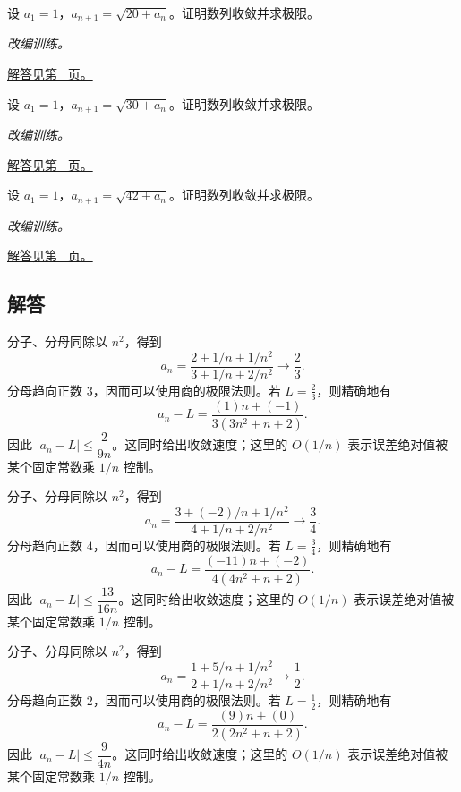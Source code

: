 \documentclass[UTF8,12pt,a4paper,fontset=fandol]{ctexart}
\begin{document}
\begin{example}[根式递推与单调有界]\label{ex:c1q22}
设 $a_1=1$，$a_{n+1}=\sqrt{20+a_n}$。证明数列收敛并求极限。
\par\textit{改编训练。}\par\hyperref[ans:c1q22]{解答见第~\pageref{ans:c1q22} 页。}
\end{example}
\begin{example}[根式递推与单调有界]\label{ex:c1q23}
设 $a_1=1$，$a_{n+1}=\sqrt{30+a_n}$。证明数列收敛并求极限。
\par\textit{改编训练。}\par\hyperref[ans:c1q23]{解答见第~\pageref{ans:c1q23} 页。}
\end{example}
\begin{example}[根式递推与单调有界]\label{ex:c1q24}
设 $a_1=1$，$a_{n+1}=\sqrt{42+a_n}$。证明数列收敛并求极限。
\par\textit{改编训练。}\par\hyperref[ans:c1q24]{解答见第~\pageref{ans:c1q24} 页。}
\end{example}
\subsection{解答}
\begin{solve}\label{ans:c1q1}
分子、分母同除以 $n^2$，得到
\[
a_n=\frac{2+1/n+1/n^2}{3+1/n+2/n^2}\longrightarrow \frac{2}{3}.
\]
分母趋向正数 $3$，因而可以使用商的极限法则。若 $L=\frac{2}{3}$，则精确地有
\[
a_n-L=\frac{(1)n+(-1)}{3(3n^2+n+2)}.
\]
因此 $|a_n-L|\le\dfrac{2}{9n}$。这同时给出收敛速度；这里的 $O(1/n)$ 表示误差绝对值被某个固定常数乘 $1/n$ 控制。
\end{solve}

\begin{solve}\label{ans:c1q2}
分子、分母同除以 $n^2$，得到
\[
a_n=\frac{3+(-2)/n+1/n^2}{4+1/n+2/n^2}\longrightarrow \frac{3}{4}.
\]
分母趋向正数 $4$，因而可以使用商的极限法则。若 $L=\frac{3}{4}$，则精确地有
\[
a_n-L=\frac{(-11)n+(-2)}{4(4n^2+n+2)}.
\]
因此 $|a_n-L|\le\dfrac{13}{16n}$。这同时给出收敛速度；这里的 $O(1/n)$ 表示误差绝对值被某个固定常数乘 $1/n$ 控制。
\end{solve}

\begin{solve}\label{ans:c1q3}
分子、分母同除以 $n^2$，得到
\[
a_n=\frac{1+5/n+1/n^2}{2+1/n+2/n^2}\longrightarrow \frac{1}{2}.
\]
分母趋向正数 $2$，因而可以使用商的极限法则。若 $L=\frac{1}{2}$，则精确地有
\[
a_n-L=\frac{(9)n+(0)}{2(2n^2+n+2)}.
\]
因此 $|a_n-L|\le\dfrac{9}{4n}$。这同时给出收敛速度；这里的 $O(1/n)$ 表示误差绝对值被某个固定常数乘 $1/n$ 控制。
\end{solve}
\end{document}
